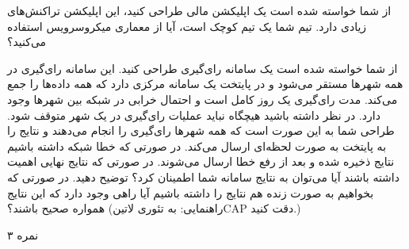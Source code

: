 \documentclass[../main.tex]{subfiles}
\begin{document}

از شما خواسته شده است یک اپلیکشن مالی طراحی کنید، این اپلیکشن تراکنش‌های زیادی دارد. تیم شما یک تیم کوچک است، آیا از معماری میکروسرویس استفاده می‌کنید؟

از شما خواسته شده است یک سامانه رای‌گیری طراحی کنید. این سامانه رای‌گیری در همه شهرها مستقر می‌شود و در پایتخت یک سامانه مرکزی دارد که همه داده‌ها را جمع می‌کند. مدت رای‌گیری یک روز کامل است و احتمال خرابی در شبکه بین شهرها وجود دارد. در نظر داشته باشید هیچگاه نباید عملیات رای‌گیری در یک شهر متوقف شود.
طراحی شما به این صورت است که همه شهرها رای‌گیری را انجام می‌دهند و نتایج را به پایتخت به صورت لحظه‌ای ارسال می‌کند. در صورتی که خطا شبکه داشته باشیم نتایج ذخیره شده و بعد از رفع خطا ارسال می‌شوند.
در صورتی که نتایج نهایی اهمیت داشته باشند آیا می‌توان به نتایج سامانه شما اطمینان کرد؟ توضیح دهید. در صورتی که بخواهیم به صورت زنده هم نتایج را داشته باشیم آیا راهی وجود دارد که این نتایج همواره صحیح باشند؟ (راهنمایی: به تئوری ‌لاتین{CAP} دقت کنید.)

۳ نمره
\end{document}
